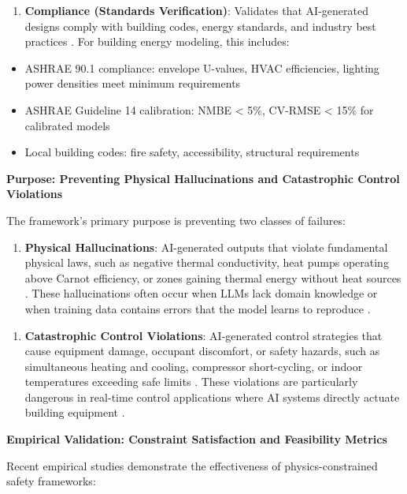 \documentclass[12pt,a4paper]{article}
\begin{document}
\begin{enumerate}
  \item \textbf{Compliance (Standards Verification)}: Validates that AI-generated designs comply with building codes, energy standards, and industry best practices \cite{ref188}. For building energy modeling, this includes:
\end{enumerate}
\begin{itemize}
  \item ASHRAE 90.1 compliance: envelope U-values, HVAC efficiencies, lighting power densities meet minimum requirements \cite{ref189}
  \item ASHRAE Guideline 14 calibration: NMBE < 5\%, CV-RMSE < 15\% for calibrated models \cite{ref190}
  \item Local building codes: fire safety, accessibility, structural requirements \cite{ref191}
\end{itemize}

\textbf{Purpose: Preventing Physical Hallucinations and Catastrophic Control Violations}

The framework's primary purpose is preventing two classes of failures:

\begin{enumerate}
  \item \textbf{Physical Hallucinations}: AI-generated outputs that violate fundamental physical laws, such as negative thermal conductivity, heat pumps operating above Carnot efficiency, or zones gaining thermal energy without heat sources \cite{ref192}. These hallucinations often occur when LLMs lack domain knowledge or when training data contains errors that the model learns to reproduce \cite{ref193}.
\end{enumerate}

\begin{enumerate}
  \item \textbf{Catastrophic Control Violations}: AI-generated control strategies that cause equipment damage, occupant discomfort, or safety hazards, such as simultaneous heating and cooling, compressor short-cycling, or indoor temperatures exceeding safe limits \cite{ref194}. These violations are particularly dangerous in real-time control applications where AI systems directly actuate building equipment \cite{ref195}.
\end{enumerate}

\textbf{Empirical Validation: Constraint Satisfaction and Feasibility Metrics}

Recent empirical studies demonstrate the effectiveness of physics-constrained safety frameworks:
\end{document}
